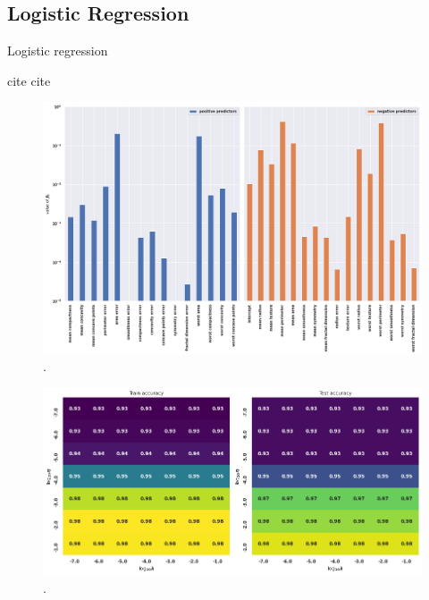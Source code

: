 \documentclass[]{article}
\begin{document}
\subsection{Logistic Regression}

Logistic regression 



cite \cite{skl-datasets}
cite \cite{mnist}

\begin{figure}[!htb]
	\centering
	\includegraphics[width=1\linewidth]{log_breast_cancer_bars.png}
	\caption{.}
	\label{fig:log_breast_cancer_bars}
\end{figure}


\begin{figure}[!htb]
	\centering
	\includegraphics[width=1\linewidth]{log_breast_cancer.png}
	\caption{.}
	\label{fig:log_breast_cancer}
\end{figure}
\end{document}
